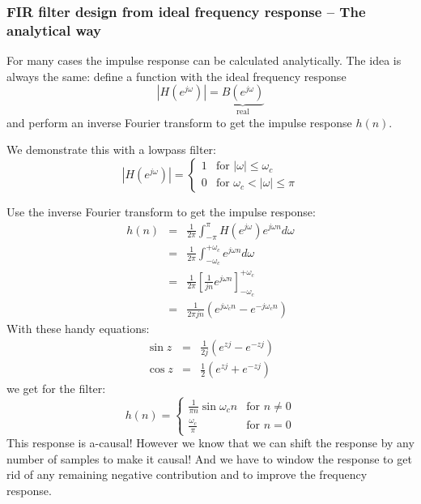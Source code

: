 \documentclass[12pt,a4paper]{article}
\begin{document}
\subsubsection{FIR filter design from ideal frequency response --
The analytical way
\label{idealFilt}}
For many cases the impulse response can be calculated analytically.
The idea is always the same: define a function with the ideal frequency
response
\begin{equation}
|H(e^{j\omega})| = \underbrace{B(e^{j\omega})}_{\mbox{real}}
\end{equation}
and perform an inverse Fourier transform to get the impulse response
$h(n)$.

We demonstrate this with a lowpass filter:
\begin{equation}
|H(e^{j\omega})| =
\left\{
\begin{array}{ll}
1 & \mbox{for } |\omega| \leq \omega_{c} \\
0 & \mbox{for } \omega_c < |\omega| \leq \pi
\end{array}
\right.
\end{equation}

Use the inverse Fourier transform to get the impulse response:
\begin{eqnarray}
h(n) & = & \frac{1}{2 \pi} \int_{-\pi}^{\pi} H(e^{j \omega}) e^{j \omega n} d\omega \\
     & = & \frac{1}{2 \pi} \int_{- \omega_{c}}^{+ \omega_{c}} e^{j \omega n} d\omega \\
     & = & \frac{1}{2 \pi} \left[\frac{1}{jn} e^{j \omega n} \right]_{- \omega_{c}}^{+ \omega_{c}} \\
     & = & \frac{1}{2 \pi jn} \left( e^{j \omega_{c} n} - e^{-j \omega_{c}n} \right)
\end{eqnarray}
With these handy equations:
\begin{eqnarray}
\sin z & = & \frac{1}{2j} (e^{zj} - e^{-zj})\\
\cos z & = & \frac{1}{2} (e^{zj} + e^{-zj})
\end{eqnarray}
we get for the filter:
\begin{equation}
h(n) = 
\left\{
\begin{array}{cc}
\frac{1}{\pi n} \sin \omega_{c}n & \mbox{for } n \neq 0 \\
\frac{\omega_{c}}{\pi} & \mbox{for }n = 0
\end{array}
\right.
\end{equation}
This response is a-causal! However we know that we can shift the response 
by any number of samples to make it causal! And we have to window the
response to get rid of any remaining negative contribution and to
improve the frequency response.
\end{document}
